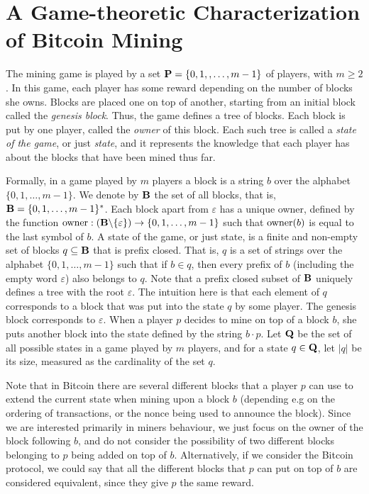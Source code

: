 
\section{A Game-theoretic Characterization of Bitcoin Mining}
\label{sec-formalization}
The mining game is played by a set $\mathbf{P} = \{0, 1, , \ldots, m-1\}$ of players, with $m \geq 2$. In this game, each player has some reward depending on the number of blocks she owns. Blocks are placed one on top of another, starting from an initial block called the {\em genesis block}. Thus, the game defines a tree of blocks. Each block is put by one player, called the {\em owner} of this block. Each such tree is called a {\em state of the game}, or just {\em state}, and it represents the knowledge that each player has about the blocks that have been mined thus far.

Formally, in a game played by $m$ players a block is a string $b$ over the alphabet $\{0,1,\ldots, m-1\}$. We denote by $\mathbf{B}$ the set of all blocks, that is, $\mathbf{B} = \{0,1,\ldots , m-1\}^*$. Each block apart from $\varepsilon$ has a unique owner, defined by the function $\text{\rm owner}: (\mathbf{B} \backslash \{\varepsilon\}) \rightarrow \{0,1, \ldots ,m-1\}$ such that $\text{\rm owner}(b)$ is equal to the last symbol of $b$. A state of the game, or just state,  is a finite and non-empty set of blocks $q \subseteq \mathbf{B}$ that is prefix closed. That is, $q$ is a set of strings over the alphabet $\{0,1,\ldots, m-1\}$ such that if $b\in q$, then every prefix of $b$ (including the empty word $\varepsilon$) also belongs to $q$. Note that a prefix closed subset of $\mathbf{B}$ uniquely defines a tree with the root $\varepsilon$. 
%
The intuition here is that each element of $q$ corresponds to a block that was put into the state $q$ by some player. The genesis block corresponds to $\varepsilon$. When a player $p$ decides to mine on top of a block $b$, she puts another block into the state defined by the string $b\cdot p$.
%
Let $\mathbf{Q}$ be the set of all possible states in a game played by $m$ players, and for a state $q \in \mathbf{Q}$, let $|q|$ be its size, measured as the cardinality of the set $q$. 

Note that in Bitcoin there are several different blocks that a player $p$ can use to extend the current state when mining upon a block $b$ (depending e.g on the ordering of transactions, or the nonce being used to announce the block). Since we are interested primarily in miners behaviour, we just focus on the owner of the block following $b$, and do not consider the possibility of two different blocks belonging to $p$ being added on top of $b$. Alternatively, if we consider the Bitcoin protocol, we could say that all the different blocks that $p$ can put on top of $b$ are considered equivalent, since they give $p$ the same reward.  

